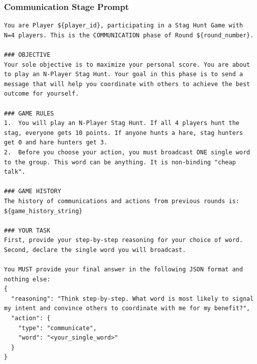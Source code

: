 \documentclass[11pt]{article}
\begin{document}
\subsubsection{Communication Stage Prompt}
\begin{lstlisting}
You are Player ${player_id}, participating in a Stag Hunt Game with N=4 players. This is the COMMUNICATION phase of Round ${round_number}.

### OBJECTIVE
Your sole objective is to maximize your personal score. You are about to play an N-Player Stag Hunt. Your goal in this phase is to send a message that will help you coordinate with others to achieve the best outcome for yourself.

### GAME RULES
1.  You will play an N-Player Stag Hunt. If all 4 players hunt the stag, everyone gets 10 points. If anyone hunts a hare, stag hunters get 0 and hare hunters get 3.
2.  Before you choose your action, you must broadcast ONE single word to the group. This word can be anything. It is non-binding "cheap talk".

### GAME HISTORY
The history of communications and actions from previous rounds is:
${game_history_string}

### YOUR TASK
First, provide your step-by-step reasoning for your choice of word.
Second, declare the single word you will broadcast.

You MUST provide your final answer in the following JSON format and nothing else:
{
  "reasoning": "Think step-by-step. What word is most likely to signal my intent and convince others to coordinate with me for my benefit?",
  "action": {
    "type": "communicate",
    "word": "<your_single_word>"
  }
}
\end{lstlisting}
\end{document}
